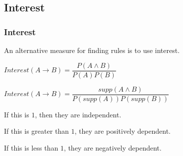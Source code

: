 
\subsection{Interest}

\subsubsection{Interest}

An alternative measure for finding rules is to use interest.

\(Interest(A\rightarrow B)=\dfrac{P(A\land B)}{P(A)P(B)}\)

\(Interest(A\rightarrow B)=\dfrac{supp(A\land B)}{P(supp(A))P(supp(B))}\)

If this is \(1\), then they are independent.

If this is greater than \(1\), they are positively dependent.

If this is less than \(1\), they are negatively dependent.

